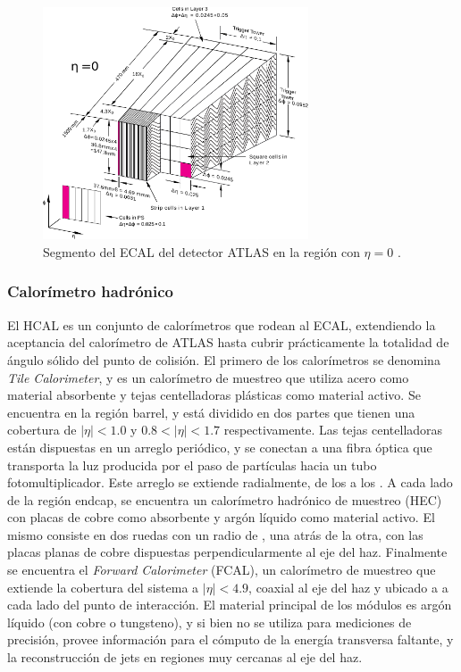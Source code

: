 \begin{figure}
\centering
  \includegraphics[width=0.7\textwidth]{images/lhc/ecal.pdf}
  \caption{Segmento del ECAL del detector ATLAS en la región con $\eta=0$ \cite{PERF-2017-01}.}
  \label{fig:ecal}
\end{figure}

\subsubsection{Calorímetro hadrónico}

El HCAL es un conjunto de calorímetros que rodean al ECAL, extendiendo la aceptancia del calorímetro de ATLAS hasta cubrir prácticamente la totalidad de ángulo sólido del punto de colisión. El primero de los calorímetros se denomina \textit{Tile Calorimeter}, y es un calorímetro de muestreo que utiliza acero como material absorbente y tejas centelladoras plásticas como material activo. Se encuentra en la región barrel, y está dividido en dos partes que tienen una cobertura de $|\eta|<1.0$ y $0.8<|\eta|<1.7$ respectivamente. Las tejas centelladoras están dispuestas en un arreglo
periódico, y se conectan a una fibra óptica que transporta la luz producida por el paso
de partículas hacia un tubo fotomultiplicador. Este arreglo se extiende radialmente, de los
 a los . 
A cada lado de la región endcap, se encuentra un calorímetro hadrónico de muestreo (HEC) con placas de cobre como absorbente y argón líquido como material activo. El mismo consiste en dos ruedas con un radio de , una atrás de la otra, con las placas planas de cobre dispuestas perpendicularmente al eje del haz. Finalmente se encuentra el \textit{Forward Calorimeter} (FCAL), un calorímetro de muestreo que extiende la cobertura del sistema a $|\eta|<4.9$, coaxial
al eje del haz y ubicado a  a cada lado del punto de interacción. El material
principal de los módulos es argón líquido (con cobre o tungsteno), y si bien no se
utiliza para mediciones de precisión, provee información para el cómputo de la energía transversa faltante, y la reconstrucción de jets en regiones muy cercanas al eje
del haz.



